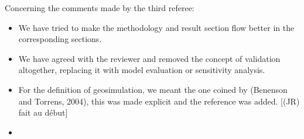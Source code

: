 \documentclass[11pt,a4paper,sans]{moderncv}        %
\begin{document}
Concerning the comments made by the third referee:


\begin{itemize}
	\item We have tried to make the methodology and result section flow better in the corresponding sections.
	
	\item We have agreed with the reviewer and removed the concept of validation altogether, replacing it with model evaluation or sensitivity analysis.
	
	\item For the definition of geosimulation, we meant the one coined by (Benenson and Torrens, 2004), this was made explicit and the reference was added. 
    [(JR) fait au début]
	
	\item 
	

\end{itemize}
\end{document}
